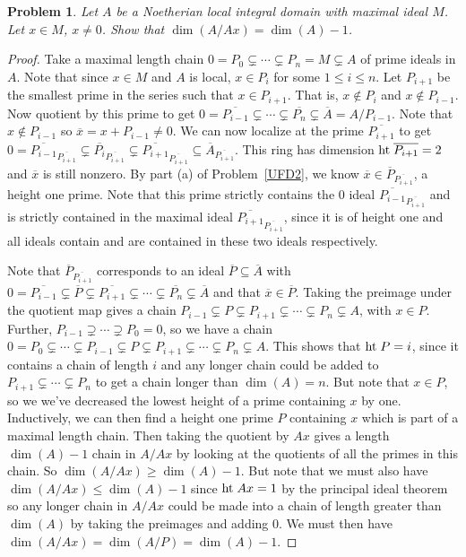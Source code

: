 \documentclass{article}
\newcommand{\Ht}{\textup{ht}\;}
\newtheorem{problem}{Problem}
\begin{document}
\begin{problem}
\label{downbyone}
Let $A$ be a Noetherian local integral domain with maximal ideal $M$. Let $x \in M$, $x \neq 0$. Show that $\dim(A/Ax) = \dim(A) - 1$.
\end{problem}
\begin{proof}
Take a maximal length chain $0 = P_0 \subsetneq \cdots \subsetneq P_n = M \subsetneq A$ of prime ideals in $A$. Note that since $x \in M$ and $A$ is local, $x \in P_i$ for some $1 \leq i \leq n$. Let $P_{i+1}$ be the smallest prime in the series such that $x \in P_{i+1}$. That is, $x \notin P_i$ and $x \notin P_{i-1}$. Now quotient by this prime to get $0 = \overline{P_{i-1}} \subsetneq \cdots \subsetneq \overline{P_n} \subsetneq \overline{A} = A/P_{i-1}$. Note that $x \notin P_{i-1}$ so $\overline{x} = x + P_{i-1} \neq 0$. We can now localize at the prime $\overline{P_{i+1}}$ to get $0 = \overline{P_{i-1}}_{\overline{P_{i+1}}} \subsetneq \overline{P_i}_{\overline{P_{i+1}}} \subsetneq \overline{P_{i+1}}_{\overline{P_{i+1}}} \subseteq \overline{A}_{\overline{P_{i+1}}}$. This ring has dimension $\Ht \overline{P_{i+1}} = 2$ and $\overline{x}$ is still nonzero. By part (a) of Problem~\ref{UFD2}, we know $\overline{x} \in \overline{P}_{\overline{P_{i+1}}}$, a height one prime. Note that this prime strictly contains the $0$ ideal $\overline{P_{i-1}}_{\overline{P_{i+1}}}$ and is strictly contained in the maximal ideal $\overline{P_{i+1}}_{\overline{P_{i+1}}}$, since it is of height one and all ideals contain and are contained in these two ideals respectively.

Note that $\overline{P}_{\overline{P_{i+1}}}$ corresponds to an ideal $\overline{P} \subseteq \overline{A}$ with $0 = \overline{P_{i-1}} \subsetneq \overline{P} \subsetneq \overline{P_{i+1}} \subsetneq \cdots \subsetneq \overline{P_n} \subsetneq \overline{A}$ and that $\overline{x} \in \overline{P}$. Taking the preimage under the quotient map gives a chain $P_{i-1} \subsetneq P \subsetneq P_{i+1} \subsetneq \cdots \subsetneq P_n \subsetneq A$, with $x \in P$. Further, $P_{i-1} \supsetneq \cdots \supsetneq P_0 = 0$, so we have a chain $0 = P_0 \subsetneq \cdots \subsetneq P_{i-1} \subsetneq P \subsetneq P_{i+1} \subsetneq \cdots \subsetneq P_n \subsetneq A$. This shows that $\Ht P = i$, since it contains a chain of length $i$ and any longer chain could be added to $P_{i+1} \subsetneq \cdots \subsetneq P_n$ to get a chain longer than $\dim(A) = n$. But note that $x \in P$, so we we've decreased the lowest height of a prime containing $x$ by one. Inductively, we can then find a height one prime $P$ containing $x$ which is part of a maximal length chain. Then taking the quotient by $Ax$ gives a length $\dim(A) - 1$ chain in $A/Ax$ by looking at the quotients of all the primes in this chain. So $\dim(A/Ax) \geq \dim(A) - 1$. But note that we must also have $\dim(A/Ax) \leq \dim(A) - 1$ since $\Ht Ax = 1$ by the principal ideal theorem so any longer chain in $A/Ax$ could be made into a chain of length greater than $\dim(A)$ by taking the preimages and adding $0$. We must then have $\dim(A/Ax) = \dim(A/P) = \dim(A) - 1$.
\end{proof}
\end{document}
